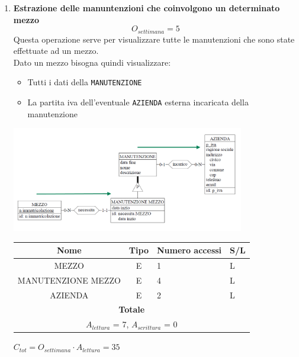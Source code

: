 \documentclass[12pt,a4paper]{report}
\begin{document}
\begin{enumerate}[label=\textbf{\arabic*)}]
    \item \textbf{Estrazione delle manuntenzioni che coinvolgono un determinato mezzo} \label{op7} \\
    \[ {O_{settimana} = 5} \]
    Questa operazione serve per visualizzare tutte le manutenzioni che sono state effettuate ad un mezzo.\\
    Dato un mezzo bisogna quindi visualizzare:
    \begin{itemize}
    \renewcommand\labelitemi{--}
    \item Tutti i dati della \texttt{MANUTENZIONE}
    \item La partita iva dell'eventuale \texttt{AZIENDA} esterna incaricata della manutenzione
    \end{itemize}
    \begin{center}
    \includegraphics[width=0.8\textwidth]{VisualManutenzioniMezzo}
    \end{center}
    \begin{table}[H]
    \centering
    \begin{tabular}{|c|c|l|l|}
    \hline
    \textbf{Nome} & \textbf{Tipo} & \textbf{Numero accessi} & \textbf{S/L} \\
    \hline
    MEZZO & E & 1 & L \\
    \hline
    MANUTENZIONE MEZZO & E & 4 & L \\
    \hline
    AZIENDA & E & 2 & L \\
    \hline
    \multicolumn{4}{c}{\textbf{Totale}} \\
    \multicolumn{4}{c}{${A_{lettura}}$ = 7, ${A_{scrittura}}$ = 0} \\
    \hline
    \end{tabular}
    \end{table}
    \begin{center}
    ${C_{tot} = {O_{settimana}}\cdot{A_{lettura}}= 35}$
    \end{center}



\end{enumerate}
\end{document}
